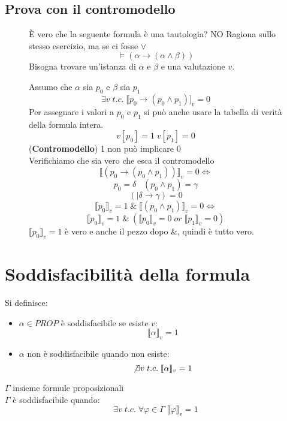 \documentclass{article}
\theoremstyle{break}
\theoremstyle{break}
\theoremstyle{break}
\theoremstyle{break}
\begin{document}
\subsection{Prova con il contromodello}
\begin{figure}[H]
  \begin{exercise}
    È vero che la seguente formula è una tautologia? NO
    Ragiona sullo stesso esercizio, ma se ci fosse \( \vee \)
    \[
      \models (\alpha \to (\alpha \wedge \beta))
    \]
    Bisogna trovare un'istanza di \( \alpha \) e \( \beta \) e una valutazione \( v \).

    Assumo che \( \alpha \) sia \( p_0 \) e \( \beta \) sia \( p_1 \)
    \[ \exists v\; t.c.\; \llbracket p_0 \to (p_0 \wedge p_1)]_v=0 \]
    Per assegnare i valori a \( p_0 \) e \( p_1 \) si può anche usare
    la tabella di verità della formula intera.
    \[v[p_0]=1\; v[p_1]=0 \] (\textbf{Contromodello}) 1 non può implicare 0\\
    Verifichiamo che sia vero che esca il contromodello
    \[
      \llbracket (p_0 \to (p_0 \wedge p_1))\rrbracket_v=0 \Leftrightarrow
      \]\[
      p_0=\delta\; \; \; (p_0 \wedge p_1) = \gamma
      \] \[
      (|\delta \to  \gamma) = 0
      \] \[
      \llbracket p_0\rrbracket_v=1 \;\&\; \llbracket (p_0 \wedge p_1)\rrbracket_v=0 \Leftrightarrow
      \] \[
      \llbracket p_0\rrbracket_v=1 \;\&\; (\llbracket p_0\rrbracket_v=0 \; or \; \llbracket p_1\rrbracket_v=0)
    \]
    \( \llbracket p_0\rrbracket_v=1 \) è vero e anche il pezzo dopo \&, quindi è tutto vero.

  \end{exercise}
\end{figure}

\section{Soddisfacibilità della formula}
Si definisce:
\begin{itemize}
  \item \( \alpha \in PROP \) è soddisfacibile se esiste \( v \):
    \[
      \llbracket \alpha\rrbracket_v = 1
    \]
  \item \( \alpha \) non è soddisfacibile quando non esiste:
    \[
      \not\exists v\; t.c.\; \llbracket \alpha\rrbracket_v = 1
    \]
\end{itemize}
\( \Gamma \) insieme formule proposizionali\\
\( \Gamma \) è soddisfacibile quando:
\[
  \exists v\; t.c.\; \forall \varphi \in \Gamma\; \llbracket \varphi\rrbracket_v = 1
\]
\end{document}

